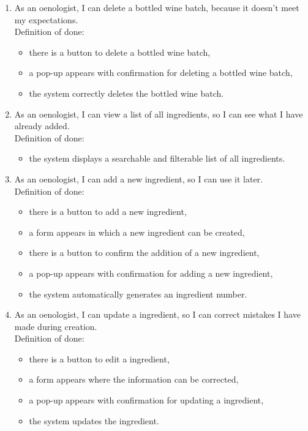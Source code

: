 \begin{enumerate}
	\item As an oenologist, I can delete a bottled wine batch, because it doesn't meet my expectations.
	\\Definition of done:
	\begin{itemize}
		\item there is a button to delete a bottled wine batch,
		\item a pop-up appears with confirmation for deleting a bottled wine batch,
		\item the system correctly deletes the bottled wine batch.
	\end{itemize}
	\item As an oenologist, I can view a list of all ingredients, so I can see what I have already added.
	\\Definition of done:
	\begin{itemize}
		\item the system displays a searchable and filterable list of all ingredients.
	\end{itemize}
	\item As an oenologist, I can add a new ingredient, so I can use it later.
	\\Definition of done:
	\begin{itemize}
		\item there is a button to add a new ingredient,
		\item a form appears in which a new ingredient can be created,
		\item there is a button to confirm the addition of a new ingredient,
		\item a pop-up appears with confirmation for adding a new ingredient,
		\item the system automatically generates an ingredient number.
	\end{itemize}
	\item As an oenologist, I can update a ingredient, so I can correct mistakes I have made during creation.
	\\Definition of done:
	\begin{itemize}
		\item there is a button to edit a ingredient,
		\item a form appears where the information can be corrected,
		\item a pop-up appears with confirmation for updating a ingredient,
		\item the system updates the ingredient.

\end{itemize}
\end{enumerate}
